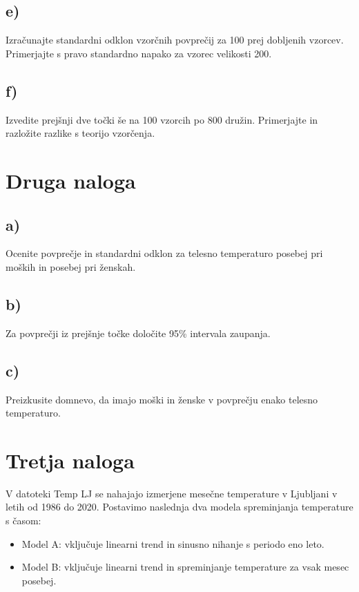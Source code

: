 \documentclass[12pt, a4paper]{article}
\begin{document}
\subsection{e)}
Izračunajte standardni odklon vzorčnih povprečij za 100 prej dobljenih 
vzorcev. Primerjajte s pravo standardno napako za vzorec velikosti 200.

\subsection{f)}
Izvedite prejšnji dve točki še na 100 vzorcih po 800 družin. Primerjajte 
in razložite razlike s teorijo vzorčenja.



\section{Druga naloga}

\subsection{a)}
Ocenite povprečje in standardni odklon za telesno temperaturo posebej pri
moških in posebej pri ženskah.

\subsection{b)}
Za povprečji iz prejšnje točke določite 95\% intervala zaupanja.

\subsection{c)}
Preizkusite domnevo, da imajo moški in ženske v povprečju enako telesno 
temperaturo.



\section{Tretja naloga}

V datoteki Temp LJ se nahajajo izmerjene mesečne temperature v Ljubljani v 
letih od 1986 do 2020. Postavimo naslednja dva modela spreminjanja temperature
s časom: 

\begin{itemize}
     
    \item Model A: vključuje linearni trend in sinusno nihanje s periodo eno 
        leto.
    \item Model B: vključuje linearni trend in spreminjanje temperature za 
        vsak mesec posebej.

\end{itemize}
\end{document}
